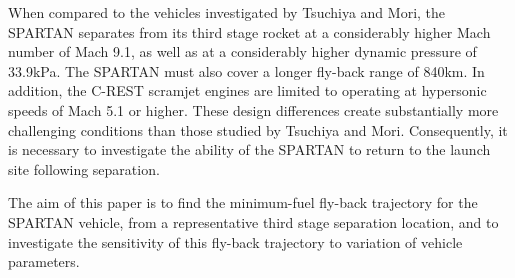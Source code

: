 \documentclass[conf]{new-aiaa}
\begin{document}
When compared to the vehicles investigated by Tsuchiya and Mori\cite{Tsuchiya2005}, the SPARTAN separates from its third stage rocket at a considerably higher Mach number of Mach 9.1, as well as at a considerably higher dynamic pressure of 33.9kPa. The SPARTAN must also cover a longer fly-back range of 840km. In addition, the C-REST scramjet engines are limited to operating at hypersonic speeds of Mach 5.1 or higher. These design differences create substantially more challenging conditions than those studied by Tsuchiya and Mori. Consequently, it is necessary to investigate the ability of the SPARTAN to return to the launch site following separation. 

The aim of this paper is to find the minimum-fuel fly-back trajectory for the SPARTAN vehicle, from a representative third stage separation location, and to investigate the sensitivity of this fly-back trajectory to variation of vehicle parameters. 








\end{document}

